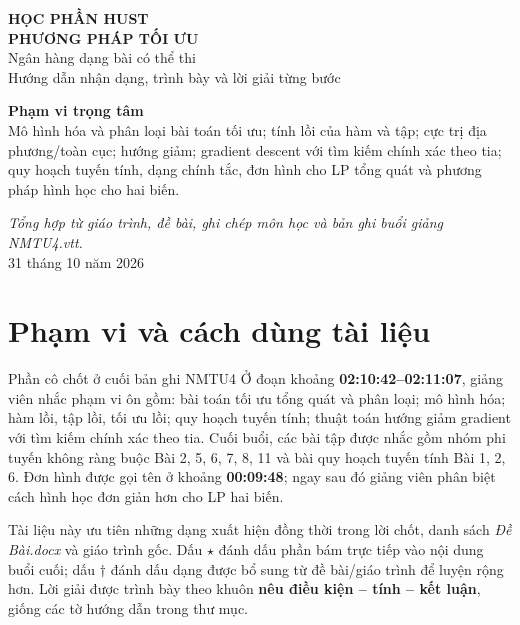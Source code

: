 \documentclass[11pt,a4paper]{article}
\begin{document}
\begin{titlepage}
\centering
\vspace*{2.1cm}
{\Large\color{teal}\textbf{HỌC PHẦN HUST}}\\[1.2cm]
{\Huge\color{navy}\textbf{PHƯƠNG PHÁP TỐI ƯU}}\\[0.5cm]
{\LARGE Ngân hàng dạng bài có thể thi}\\[0.35cm]
{\large Hướng dẫn nhận dạng, trình bày và lời giải từng bước}\\[1.4cm]
\begin{tcolorbox}[width=.88\textwidth,colback=pale,colframe=navy,arc=2mm]
\centering
\textbf{Phạm vi trọng tâm}\\[4pt]
Mô hình hóa và phân loại bài toán tối ưu; tính lồi của hàm và tập; cực trị địa phương/toàn cục; hướng giảm; gradient descent với tìm kiếm chính xác theo tia; quy hoạch tuyến tính, dạng chính tắc, đơn hình cho LP tổng quát và phương pháp hình học cho hai biến.
\end{tcolorbox}
\vfill
\textit{Tổng hợp từ giáo trình, đề bài, ghi chép môn học và bản ghi buổi giảng NMTU4.vtt.}\\[4pt]
31 tháng 10 năm 2026
\end{titlepage}

\renewcommand{\contentsname}{Mục lục}
\begingroup
\small
\setlength{\parskip}{0pt}
\tableofcontents
\endgroup
\clearpage

\section*{Phạm vi và cách dùng tài liệu}
\begin{keybox}{Phần cô chốt ở cuối bản ghi NMTU4}
Ở đoạn khoảng \textbf{02:10:42--02:11:07}, giảng viên nhắc phạm vi ôn gồm: bài toán tối ưu tổng quát và phân loại; mô hình hóa; hàm lồi, tập lồi, tối ưu lồi; quy hoạch tuyến tính; thuật toán hướng giảm gradient với tìm kiếm chính xác theo tia. Cuối buổi, các bài tập được nhắc gồm nhóm phi tuyến không ràng buộc Bài 2, 5, 6, 7, 8, 11 và bài quy hoạch tuyến tính Bài 1, 2, 6. Đơn hình được gọi tên ở khoảng \textbf{00:09:48}; ngay sau đó giảng viên phân biệt cách hình học đơn giản hơn cho LP hai biến.
\end{keybox}

Tài liệu này ưu tiên những dạng xuất hiện đồng thời trong lời chốt, danh sách \textit{Đề Bài.docx} và giáo trình gốc. Dấu \(\star\) đánh dấu phần bám trực tiếp vào nội dung buổi cuối; dấu \(\dagger\) đánh dấu dạng được bổ sung từ đề bài/giáo trình để luyện rộng hơn. Lời giải được trình bày theo khuôn \textbf{nêu điều kiện -- tính -- kết luận}, giống các tờ hướng dẫn trong thư mục.
\end{document}
